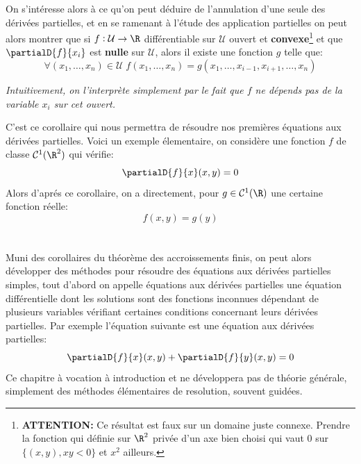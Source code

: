 \subsection*{}
On s'intéresse alors à ce qu'on peut déduire de l'annulation d'une seule des dérivées partielles, et en se ramenant à l'étude des application partielles on peut alors montrer que si \(f : \mathcal{U} \rightarrow \R\) différentiable sur \(\mathcal{U}\) ouvert et \textbf{convexe}\footnote[2]{\textbf{ATTENTION:} Ce résultat est faux sur un domaine juste connexe. Prendre la fonction qui définie sur \(\R^2\) privée d'un axe bien choisi qui vaut \(0\) sur \(\{ (x, y), xy < 0\}\) et \(x^2\) ailleurs.} et que \(\partialD{f}{x_i}\) est \textbf{nulle} sur \(\mathcal{U}\), alors il existe une fonction \(g\) telle que:
\[
   \forall (x_1, \ldots, x_n) \in \mathcal{U} \; f(x_1, \ldots, x_n) = g(x_1, \ldots, x_{i-1}, x_{i+1}, \ldots, x_n) 
\]
\begin{center}
   \textit{Intuitivement, on l'interprète simplement par le fait que \(f\) ne dépends pas de la variable \(x_i\) sur cet ouvert.}
\end{center}
C'est ce corollaire qui nous permettra de résoudre nos premières équations aux dérivées partielles. Voici un exemple élementaire, on considère une fonction \(f\) de classe \(\mathcal{C}^1(\R^2)\) qui vérifie:
\[
   \partialD{f}{x}(x, y) = 0   
\]
Alors d'aprés ce corollaire, on a directement, pour \(g \in \mathcal{C}^1(\R)\) une certaine fonction réelle:
\[
   f(x, y) = g(y)   
\]

\chapter*{}
Muni des corollaires du théorème des accroissements finis, on peut alors développer des méthodes pour résoudre des équations aux dérivées partielles simples, tout d'abord on appelle équations aux dérivées partielles une équation différentielle dont les solutions sont des fonctions inconnues dépendant de plusieurs variables vérifiant certaines conditions concernant leurs dérivées partielles. Par exemple l'équation suivante est une équation aux dérivées partielles:
\[
   \partialD{f}{x}(x, y) + \partialD{f}{y}(x, y) = 0   
\]
Ce chapitre à vocation à introduction et ne développera pas de théorie générale, simplement des méthodes élémentaires de resolution, souvent guidées. 
